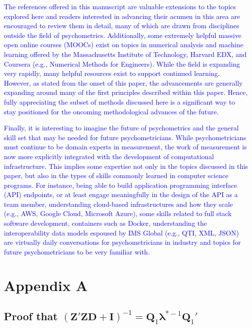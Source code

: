 \documentclass[12pt]{article}
\begin{document}
\textcolor{blue}{The references offered in this manuscript are valuable extensions to the topics explored here and readers interested in advancing their acumen in this area are encouraged to review them in detail, many of which are drawn from disciplines outside the field of psychometrics. Additionally, some extremely helpful massive open online courses (MOOCs) exist on topics in numerical analysis and machine learning offered by the Massachusetts Institute of Technology, Harvard EDX, and Coursera (e.g., Numerical Methods for Engineers). While the field is expanding very rapidly, many helpful resources exist to support continued learning. However, as stated from the onset of this paper, the advancements are generally expanding around many of the first principles described within this paper. Hence, fully appreciating the subset of methods discussed here is a significant way to stay positioned for the oncoming methodological advances of the future.}

\textcolor{blue}{Finally, it is interesting to imagine the future of psychometrics and the general skill set that may be needed for future psychometricians. While psychometricians must continue to be domain experts in measurement, the work of measurement is now more explicitly integrated with the development of computational infrastructure. This implies some expertise not only in the topics discussed in this paper, but also in the types of skills commonly learned in computer science programs. For instance, being able to build application programming interface (API) endpoints, or at least engage meaningfully in the design of the API as a team member, understanding cloud-based infrastructures and how they scale (e.g., AWS, Google Cloud, Microsoft Azure), some skills related to full stack software development, containers such as Docker, understanding the interoperability data models espoused by IMS Global (e.g., QTI, XML, JSON) are virtually daily conversations for psychometricians in industry and topics for future psychometricians to be very familiar with. }    
\newpage
\section*{Appendix A}

\subsection*{Proof that $(\bm{Z}'\bm{Z}\bm{D} + \bm{I})^{-1} = \bm{Q}_1 \bm{\lambda}^{*-1} \bm{Q}_1'$}
\end{document}
